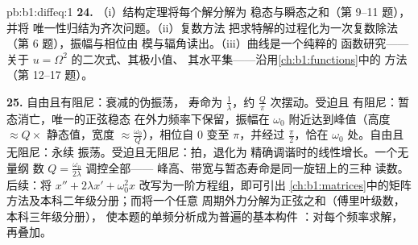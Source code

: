 \begin{solution}{pb:b1:diffeq:1}
\textbf{24.} （i）结构定理将每个解分解为
稳态与瞬态之和（第 9--11 题），并将
唯一性归结为齐次问题。（ii）复数方法
把求特解的过程化为一次复数除法
（第 6 题），振幅与相位由
模与辐角读出。（iii）曲线是一个纯粹的
函数研究——关于 $u = \Omega^2$ 的二次式、其极小值、
其水平集——沿用\cref{ch:b1:functions}中的
方法（第 12--17 题）。

\textbf{25.} 自由且有阻尼：衰减的伪振荡，
寿命为 $\frac1\lambda$，约 $\frac Q\pi$ 次摆动。受迫且
有阻尼：暂态消亡，唯一的正弦稳态
在外力频率下保留，振幅在
$\omega_0$ 附近达到峰值（高度 $\approx Q \times$ 静态值，宽度 $\approx
\frac{\omega_0}Q$），相位自 $0$ 变至 $\pi$，并经过
$\frac\pi2$，恰在 $\omega_0$ 处。自由且无阻尼：永续
振荡。受迫且无阻尼：拍，退化为
精确调谐时的线性增长。一个无量纲
数 $Q = \frac{\omega_0}{2\lambda}$ 调控全部——
峰高、带宽与暂态寿命是同一旋钮上的三种
读数。后续：将 $x'' + 2\lambda x' +
\omega_0^2x$ 改写为一阶方程组，即可引出
\cref{ch:b1:matrices}中的矩阵方法及本科二年级分册；而将一个任意
周期外力分解为正弦之和（傅里叶级数，本科三年级分册），
使本题的单频分析成为普遍的基本构件
：对每个频率求解，再叠加。
\end{solution}
